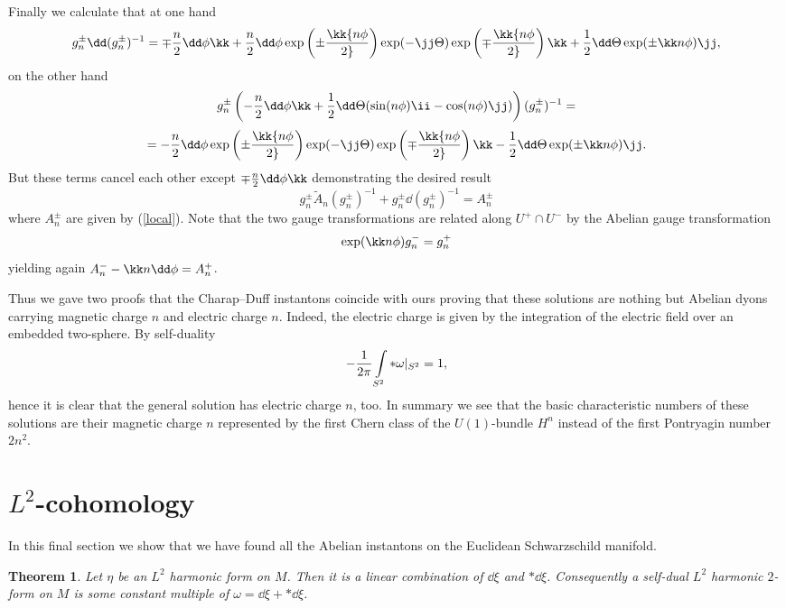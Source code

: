 \documentclass[a4paper,12pt,draft]{article}
\newtheorem{theorem}{Theorem}[section]
\begin{document}
Finally we calculate that at one hand 
\[g^\pm_n\dd (g^\pm_n)^{-1} = \mp{n\over 2}\dd\phi\kk +{n\over 2}\dd\phi
\exp\left(\pm\kk{n\phi\over 2}\right)\exp (-\jj\Theta
)\exp\left(\mp\kk{n\phi\over 2}\right)\kk +{1\over 2}\dd\Theta\exp
(\pm\kk n\phi )\jj ,\]
on the other hand
\[g_n^\pm\left( -{n\over 2}\dd\phi\kk
+{1\over 2}\dd\Theta (\sin (n\phi )\ii -\cos (n\phi )\jj
)\right)(g^\pm_n)^{-1} =\]
\[= -{n\over 2}\dd\phi\exp\left(\pm\kk{n\phi\over
2}\right)\exp (-\jj\Theta )\exp\left(\mp\kk{n\phi\over 2}\right)\kk
-{1\over 2}\dd\Theta\exp (\pm\kk n\phi )\jj .\] 
But these terms cancel each other except $\mp {n\over
2}\dd\phi\kk$ demonstrating the desired result
\[g^\pm_n\widetilde{A}_n(g^\pm_n)^{-1} +g^\pm_n\dd (g^\pm_n)^{-1} =
A^\pm_n\]
where $A^\pm_n$ are given by (\ref{local}). Note that the two gauge
transformations are related along $U^+\cap U^-$ by the Abelian
gauge transformation
\[\exp (\kk n\phi ) g^-_n=g^+_n \]
yielding again $A^-_n -\kk n\dd\phi = A^+_n$.

 
Thus we gave two proofs that the Charap--Duff instantons coincide with 
ours proving that these solutions are nothing but Abelian dyons carrying
magnetic charge $n$ and electric charge $n$. Indeed, the electric
charge is given by the integration of the electric field over an embedded
two-sphere. By self-duality
\[-{1\over 2\pi}\int\limits_{S^2}*\omega\vert_{S^2}=1,\]
hence it is clear that the general solution has electric charge $n$, too. 
In summary we see that the basic
characteristic numbers of these solutions are their magnetic charge $n$
represented by the first Chern class of the $U(1)$-bundle 
$H^n$ instead of the
first Pontryagin number $2n^2$. 

\section{$L^2$-cohomology}
In this final section we show that we have found all the Abelian
instantons on the Euclidean Schwarzschild manifold. 

\begin{theorem} Let $\eta$ be an $L^2$ harmonic form on $M$. Then it is a 
linear combination of $\dd \xi $ and $*\dd \xi$. Consequently a self-dual
$L^2$ harmonic $2$-form on $M$ is some constant multiple of 
$\omega =\dd\xi + *\dd\xi$. 
\end{theorem}
\end{document}
